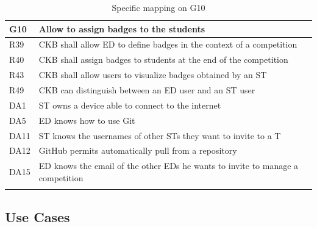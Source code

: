   \begin{longtable}{|l|p{12cm}|}
    \hline
    \textbf{G10} & \textbf{Allow to assign badges to the students}      \\
    \hline
    R39 & CKB shall allow ED to define badges in the context of a competition \\
    \hline
    R40 & CKB shall assign badges to students at the end of the competition \\
    \hline
    R43 & CKB shall allow users to visualize badges obtained by an ST \\
    \hline
    R49 & CKB can distinguish between an ED user and an ST user \\
    \hline
    DA1 & ST owns a device able to connect to the internet \\
    \hline
    DA5 & ED knows how to use Git \\
    \hline
    DA11 & ST knows the usernames of other STs they want to invite to a T \\
    \hline
    DA12 & GitHub permits automatically pull from a repository \\
    \hline
    DA15 & ED knows the email of the other EDs he wants to invite to manage a competition \\
    \hline

    \caption{Specific mapping on G10}
    \label{tab:mappingG10}
  \end{longtable}

\pagebreak

\subsection{Use Cases}
\label{ss:Use_cases}%

